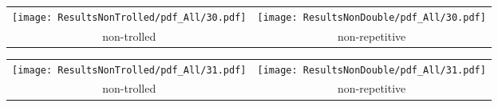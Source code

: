 \begin{tabular}{cc}
{  \texttt{[image: ResultsNonTrolled/pdf\_All/30.pdf]} } & 
{  \texttt{[image: ResultsNonDouble/pdf\_All/30.pdf]}} \\
 non-trolled & non-repetitive \\
\end{tabular}

\begin{tabular}{cc}
{  \texttt{[image: ResultsNonTrolled/pdf\_All/31.pdf]} } & 
{  \texttt{[image: ResultsNonDouble/pdf\_All/31.pdf]}} \\
 non-trolled & non-repetitive \\
\end{tabular}

